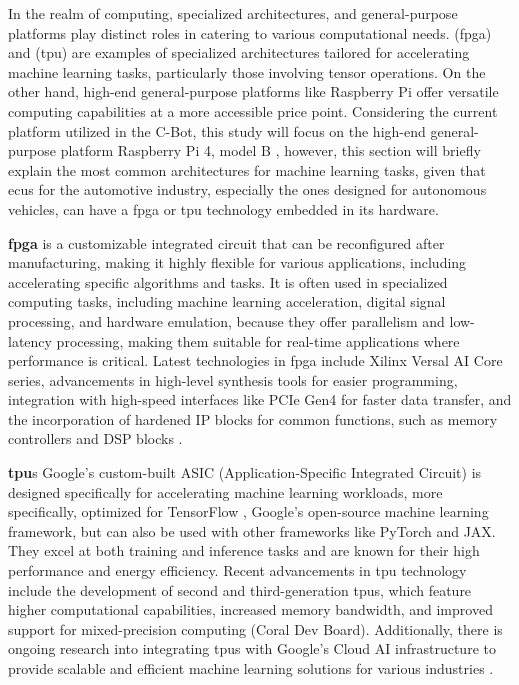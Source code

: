 In the realm of computing, specialized architectures, and general-purpose platforms play distinct roles in catering to various computational needs.  (\gls{fpga}) and  (\gls{tpu}) are examples of specialized architectures tailored for accelerating machine learning tasks, particularly those involving tensor operations. On the other hand, high-end general-purpose platforms like Raspberry Pi offer versatile computing capabilities at a more accessible price point. Considering the current platform utilized in the C-Bot, this study will focus on the high-end general-purpose platform Raspberry Pi 4, model B \cite{Raspberry2023}, however, this section will briefly explain the most common architectures for machine learning tasks, given that \gls{ecu}s for the automotive industry, especially the ones designed for autonomous vehicles, can have a \gls{fpga} or \gls{tpu} technology embedded in its hardware.

\textbf{\gls{fpga}} is a customizable integrated circuit that can be reconfigured after manufacturing, making it highly flexible for various applications, including accelerating specific algorithms and tasks. It is often used in specialized computing tasks, including machine learning acceleration, digital signal processing, and hardware emulation, because they offer parallelism and low-latency processing, making them suitable for real-time applications where performance is critical. Latest technologies in \gls{fpga} include Xilinx Versal AI Core series, advancements in high-level synthesis tools for easier programming, integration with high-speed interfaces like PCIe Gen4 for faster data transfer, and the incorporation of hardened IP blocks for common functions, such as memory controllers and DSP blocks \cite{IntelFPGA2024}.

\textbf{\gls{tpu}}s Google's custom-built ASIC (Application-Specific Integrated Circuit) is designed specifically for accelerating machine learning workloads, more specifically, optimized for TensorFlow \cite{TensorFl23}, Google's open-source machine learning framework, but can also be used with other frameworks like PyTorch and JAX. They excel at both training and inference tasks and are known for their high performance and energy efficiency. Recent advancements in \gls{tpu} technology include the development of second and third-generation \gls{tpu}s, which feature higher computational capabilities, increased memory bandwidth, and improved support for mixed-precision computing (Coral Dev Board). Additionally, there is ongoing research into integrating \gls{tpu}s with Google's Cloud AI infrastructure to provide scalable and efficient machine learning solutions for various industries \cite{GoogleTPU2024}.

